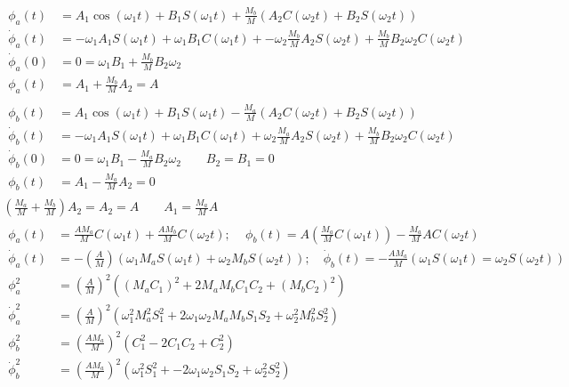 \documentclass[twoside,10pt]{amsart}
\begin{document}
\[
\begin{gathered}
\begin{aligned}
  \phi_a(t) & = A_1 \cos{ (\omega_1 t) } + B_1 S(\omega_1 t) + \frac{M_b}{M} ( A_2 C(\omega_2 t) + B_2 S(\omega_2 t) ) \\  
  \dot{\phi}_a(t) & = -\omega_1 A_1 S(\omega_1 t) + \omega_1 B_1 C(\omega_1 t ) + -\omega_2 \frac{M_b}{M} A_2 S(\omega_2 t) + \frac{M_b}{M} B_2 \omega_2 C(\omega_2 t) \\
  \dot{\phi}_a(0) & = 0 = \omega_1 B_1 + \frac{M_b}{M} B_2 \omega_2  \\
  \phi_a(t) & = A_1 + \frac{M_b}{M} A_2 = A
\end{aligned} \\
\begin{aligned}
  \phi_b(t) & = A_1 \cos{ (\omega_1 t) } + B_1 S(\omega_1 t) - \frac{M_a}{M} ( A_2 C(\omega_2 t) + B_2 S(\omega_2 t) ) \\  
  \dot{\phi}_b(t) & = -\omega_1 A_1 S(\omega_1 t) + \omega_1 B_1 C(\omega_1 t ) + \omega_2 \frac{M_a}{M} A_2 S(\omega_2 t) + \frac{M_b}{M} B_2 \omega_2 C(\omega_2 t) \\
  \dot{\phi}_b(0) & = 0 = \omega_1 B_1 - \frac{M_a}{M} B_2 \omega_2  \quad \quad B_2 = B_1 = 0 \\
  \phi_b(t) & = A_1 - \frac{M_a}{M} A_2 = 0
\end{aligned} \\
\left( \frac{M_a}{M} + \frac{M_b}{M} \right) A_2 = A_2 = A \quad \quad A_1 = \frac{M_a}{M} A \\
\begin{aligned}
  \phi_a(t) & = \frac{A M_a}{M} C(\omega_1 t) + \frac{ A M_b}{ M} C(\omega_2 t ) ; \quad \, \phi_b(t) = A \left( \frac{M_a}{M} C(\omega_1 t ) \right) - \frac{M_a}{M} A C(\omega_2 t ) \\
  \dot{\phi}_a(t) & = - \left( \frac{A}{M} \right) ( \omega_1 M_a S(\omega_1 t) + \omega_2 M_b S(\omega_2 t) ); \quad \dot{\phi}_b(t) = - \frac{AM_a}{M} (\omega_1 S(\omega_1 t) = \omega_2 S(\omega_2 t) ) \\
  \phi_a^2 & = \left( \frac{A}{M} \right)^2 ( (M_a C_1)^2 + 2 M_a M_b C_1 C_2 + (M_b C_2)^2 ) \\
  \dot{\phi}_a^2 & = \left( \frac{A}{M} \right)^2 ( \omega_1^2 M_a^2 S_1^2 + 2 \omega_1 \omega_2 M_a M_b S_1 S_2 + \omega_2^2 M_b^2 S_2^2 ) \\
  \phi_b^2 & = \left( \frac{A M_a}{M} \right)^2 ( C_1^2 - 2 C_1 C_2 + C_2^2 ) \\
  \dot{\phi}_b^2 & = \left( \frac{AM_a}{M} \right)^2 ( \omega_1^2 S_1^2 + -2 \omega_1 \omega_2 S_1 S_2 + \omega_2^2 S_2^2 )
\end{aligned} 
\end{gathered}
\]
\end{document}
